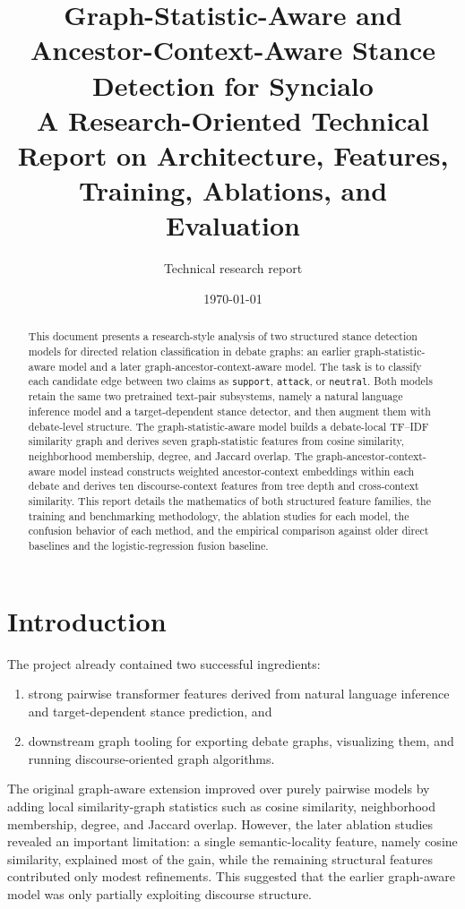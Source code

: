 \documentclass[11pt,a4paper]{article}
\title{Graph-Statistic-Aware and Ancestor-Context-Aware Stance Detection for Syncialo\\
\large A Research-Oriented Technical Report on Architecture, Features, Training, Ablations, and Evaluation}
\author{Technical research report}
\date{\today}
\begin{document}
\maketitle

\begin{abstract}
This document presents a research-style analysis of two structured stance detection models for directed relation classification in debate graphs: an earlier graph-statistic-aware model and a later graph-ancestor-context-aware model. The task is to classify each candidate edge between two claims as \texttt{support}, \texttt{attack}, or \texttt{neutral}. Both models retain the same two pretrained text-pair subsystems, namely a natural language inference model and a target-dependent stance detector, and then augment them with debate-level structure. The graph-statistic-aware model builds a debate-local TF--IDF similarity graph and derives seven graph-statistic features from cosine similarity, neighborhood membership, degree, and Jaccard overlap. The graph-ancestor-context-aware model instead constructs weighted ancestor-context embeddings within each debate and derives ten discourse-context features from tree depth and cross-context similarity. This report details the mathematics of both structured feature families, the training and benchmarking methodology, the ablation studies for each model, the confusion behavior of each method, and the empirical comparison against older direct baselines and the logistic-regression fusion baseline.
\end{abstract}

\section{Introduction}
The project already contained two successful ingredients:
\begin{enumerate}[label=\arabic*.]
  \item strong pairwise transformer features derived from natural language inference and target-dependent stance prediction, and
  \item downstream graph tooling for exporting debate graphs, visualizing them, and running discourse-oriented graph algorithms.
\end{enumerate}

The original graph-aware extension improved over purely pairwise models by adding local similarity-graph statistics such as cosine similarity, neighborhood membership, degree, and Jaccard overlap. However, the later ablation studies revealed an important limitation: a single semantic-locality feature, namely cosine similarity, explained most of the gain, while the remaining structural features contributed only modest refinements. This suggested that the earlier graph-aware model was only partially exploiting discourse structure.
\end{document}

